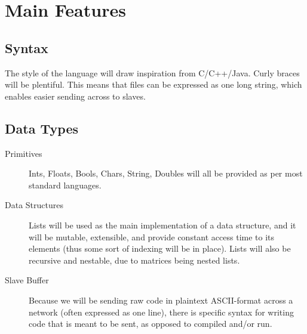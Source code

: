 \documentclass[10pt]{article}
\begin{document}
\section{Main Features}
	\subsection{Syntax}
    The style of the language will draw inspiration from C/C++/Java. Curly braces will be plentiful. This means that \name files can be expressed as one long string, which enables easier sending across to slaves.
    \subsection{Data Types}
    \begin{description}
    \item[Primitives] Ints, Floats, Bools, Chars, String, Doubles will all be provided as per most standard languages.
    \item[Data Structures] Lists will be used as the main implementation of a data structure, and it will be mutable, extensible, and provide constant access time to its elements (thus some sort of indexing will be in place). Lists will also be recursive and nestable, due to matrices being nested lists.
    \item[Slave Buffer] Because we will be sending raw code in plaintext ASCII-format across a network (often expressed as one line), there is specific syntax for writing code that is meant to be sent, as opposed to compiled and/or run.
    \end{description}
    
\end{document}
